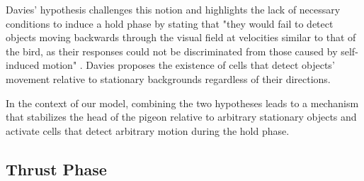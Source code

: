   Davies' hypothesis challenges this notion and highlights the lack of necessary conditions to induce a hold phase by stating that "they would fail to detect objects moving backwards through the visual field at velocities similar to that of the bird, as their responses could not be discriminated from those caused by self-induced motion" \cite{davies1988head}. Davies proposes the existence of cells that detect objects' movement relative to stationary backgrounds regardless of their directions.

  In the context of our model, combining the two hypotheses leads to a mechanism that stabilizes the head of the pigeon relative to arbitrary stationary objects and activate cells that detect arbitrary motion during the hold phase.

\subsection{Thrust Phase}

